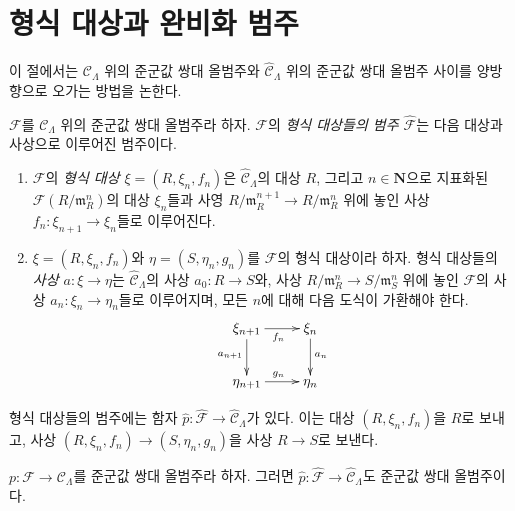 \section{형식 대상과 완비화 범주}
\label{section-formal-objects}

\noindent
이 절에서는 $\mathcal{C}_\Lambda$ 위의 준군값 쌍대 올범주와
$\widehat{\mathcal{C}}_\Lambda$ 위의 준군값 쌍대 올범주 사이를
양방향으로 오가는 방법을 논한다.

\begin{definition}
\label{definition-formal-objects}
$\mathcal{F}$를 $\mathcal{C}_\Lambda$ 위의 준군값 쌍대
올범주라 하자. $\mathcal{F}$의 {\it 형식 대상들의 범주
$\widehat{\mathcal{F}}$}는 다음 대상과 사상으로 이루어진 범주이다.
\begin{enumerate}
\item $\mathcal{F}$의 {\it 형식 대상 $\xi = (R, \xi_n, f_n)$}은
$\widehat{\mathcal{C}}_\Lambda$의 대상 $R$, 그리고
$n \in \mathbf{N}$으로 지표화된 $\mathcal{F}(R/\mathfrak m_R^n)$의
대상 $\xi_n$들과 사영
$R/\mathfrak m_R^{n + 1} \to R/\mathfrak m_R^n$ 위에 놓인 사상
$f_n : \xi_{n + 1} \to \xi_n$들로 이루어진다.
\item $\xi = (R, \xi_n, f_n)$와 $\eta = (S, \eta_n, g_n)$를
$\mathcal{F}$의 형식 대상이라 하자. 형식 대상들의 {\it 사상
$a : \xi \to \eta$}는 $\widehat{\mathcal{C}}_\Lambda$의 사상
$a_0 : R \to S$와, 사상
$R/\mathfrak m_R^n \to S/\mathfrak m_S^n$ 위에 놓인
$\mathcal{F}$의 사상 $a_n : \xi_n \to \eta_n$들로 이루어지며,
모든 $n$에 대해 다음 도식이 가환해야 한다.
$$
\xymatrix{
\xi_{n + 1} \ar[r]_{f_n} \ar[d]_{a_{n + 1}} & \xi_n \ar[d]^{a_n} \\
\eta_{n + 1} \ar[r]^{g_n} & \eta_n
}
$$
\end{enumerate}
\end{definition}

\noindent
형식 대상들의 범주에는 함자 $\widehat{p}:
\widehat{\mathcal{F}} \to \widehat{\mathcal{C}}_\Lambda$가 있다.
이는 대상 $(R, \xi_n, f_n)$을 $R$로 보내고, 사상
$(R, \xi_n, f_n) \to (S, \eta_n, g_n)$을 사상 $R \to S$로 보낸다.

\begin{lemma}
\label{lemma-completion-cofibred}
$p : \mathcal{F} \to \mathcal{C}_\Lambda$를 준군값 쌍대
올범주라 하자. 그러면
$\widehat{p} : \widehat{\mathcal{F}} \to \widehat{\mathcal{C}}_\Lambda$도
준군값 쌍대 올범주이다.
\end{lemma}

